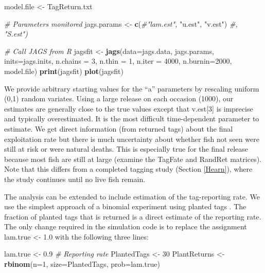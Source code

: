 \documentclass[
]{krantz}
\makeatletter
\newenvironment{Shaded}{\begin{snugshade}}{\end{snugshade}}
\newcommand{\AttributeTok}[1]{\textcolor[rgb]{0.27,0.27,0.27}{#1}}
\newcommand{\CommentTok}[1]{\textcolor[rgb]{0.37,0.37,0.37}{\textit{#1}}}
\newcommand{\DecValTok}[1]{\textcolor[rgb]{0.06,0.06,0.06}{#1}}
\newcommand{\FloatTok}[1]{\textcolor[rgb]{0.06,0.06,0.06}{#1}}
\newcommand{\FunctionTok}[1]{\textcolor[rgb]{0.27,0.27,0.27}{\textbf{#1}}}
\newcommand{\NormalTok}[1]{#1}
\newcommand{\OtherTok}[1]{\textcolor[rgb]{0.37,0.37,0.37}{#1}}
\newcommand{\StringTok}[1]{\textcolor[rgb]{0.5,0.5,0.5}{#1}}
\newenvironment{kframe}{%
\medskip{}
\setlength{\fboxsep}{.8em}
 \def\at@end@of@kframe{}%
 \ifinner\ifhmode%
  \def\at@end@of@kframe{\end{minipage}}%
  \begin{minipage}{\columnwidth}%
 \fi\fi%
 \def\FrameCommand##1{\hskip\@totalleftmargin \hskip-\fboxsep
 \colorbox{shadecolor}{##1}\hskip-\fboxsep
     \hskip-\linewidth \hskip-\@totalleftmargin \hskip\columnwidth}%
 \MakeFramed {\advance\hsize-\width
   \@totalleftmargin\z@ \linewidth\hsize
   \@setminipage}}%
 {\par\unskip\endMakeFramed%
 \at@end@of@kframe}
\renewenvironment{Shaded}{\begin{kframe}}{\end{kframe}}
\makeatother
\begin{document}
\begin{Shaded}
\begin{Highlighting}[]
\NormalTok{  model.file }\OtherTok{\textless{}{-}} \StringTok{\textquotesingle{}TagReturn.txt\textquotesingle{}}

  \CommentTok{\# Parameters monitored}
\NormalTok{  jags.params }\OtherTok{\textless{}{-}} \FunctionTok{c}\NormalTok{(}\CommentTok{\#"lam.est",}
                   \StringTok{"u.est"}\NormalTok{, }\StringTok{"v.est"}\NormalTok{)}
  \CommentTok{\#, "S.est")}

   \CommentTok{\# Call JAGS from R}
\NormalTok{  jagsfit }\OtherTok{\textless{}{-}} \FunctionTok{jags}\NormalTok{(}\AttributeTok{data=}\NormalTok{jags.data, jags.params, }\AttributeTok{inits=}\NormalTok{jags.inits,}
                  \AttributeTok{n.chains =} \DecValTok{3}\NormalTok{, }\AttributeTok{n.thin =} \DecValTok{1}\NormalTok{, }\AttributeTok{n.iter =} \DecValTok{4000}\NormalTok{, }\AttributeTok{n.burnin=}\DecValTok{2000}\NormalTok{,}
\NormalTok{                  model.file)}
  \FunctionTok{print}\NormalTok{(jagsfit)}
  \FunctionTok{plot}\NormalTok{(jagsfit)}
\end{Highlighting}
\end{Shaded}

We provide arbitrary starting values for the ``a'' parameters by rescaling uniform (0,1) random variates. Using a large release on each occasion (1000), our estimates are generally close to the true values except that v.est{[}3{]} is imprecise and typically overestimated. It is the most difficult time-dependent parameter to estimate. We get direct information (from returned tags) about the final exploitation rate but there is much uncertainty about whether fish not seen were still at risk or were natural deaths. This is especially true for the final release because most fish are still at large (examine the TagFate and RandRet matrices). Note that this differs from a completed tagging study (Section \ref{Hearn}), where the study continues until no live fish remain.

The analysis can be extended to include estimation of the tag-reporting rate. We use the simplest approach of a binomial experiment using planted tags \citep{hearn.etal2003}. The fraction of planted tags that is returned is a direct estimate of the reporting rate. The only change required in the simulation code is to replace the assignment lam.true \textless- 1.0 with the following three lines:

\begin{Shaded}
\begin{Highlighting}[]
\NormalTok{lam.true }\OtherTok{\textless{}{-}} \FloatTok{0.9}  \CommentTok{\# Reporting rate}
\NormalTok{PlantedTags }\OtherTok{\textless{}{-}} \DecValTok{30}
\NormalTok{PlantReturns }\OtherTok{\textless{}{-}} \FunctionTok{rbinom}\NormalTok{(}\AttributeTok{n=}\DecValTok{1}\NormalTok{, }\AttributeTok{size=}\NormalTok{PlantedTags, }\AttributeTok{prob=}\NormalTok{lam.true)}
\end{Highlighting}
\end{Shaded}
\end{document}
